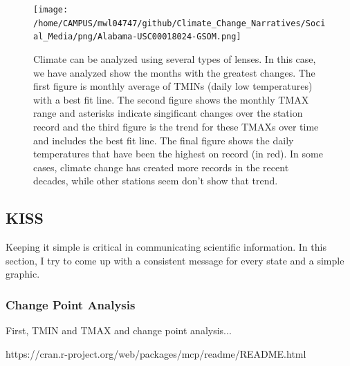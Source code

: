 \documentclass{article}\usepackage[]{graphicx}\usepackage[]{color}
\begin{document}
\begin{figure}
\texttt{[image: /home/CAMPUS/mwl04747/github/Climate\_Change\_Narratives/Social\_Media/png/Alabama-USC00018024-GSOM.png]}
\caption{Climate can be analyzed using several types of lenses. In this case, we have analyzed show the months with the greatest changes. The first figure is monthly average of TMINs (daily low temperatures) with a best fit line. The second figure shows the monthly TMAX range and asterisks indicate singificant changes over the station record and the third figure is the trend for these TMAXs over time and includes the best fit line. The final figure shows the daily temperatures that have been the highest on record (in red). In some cases, climate change has created more records in the recent decades, while other stations seem don't show that trend.}
\label{fig:GSOM}
\end{figure}

\subsection{KISS}

Keeping it simple is critical in communicating scientific information. In this section, I try to come up with a consistent message for every state and a simple graphic. 

\subsubsection{Change Point Analysis}
First, TMIN and TMAX and change point analysis...

https://cran.r-project.org/web/packages/mcp/readme/README.html
\end{document}
